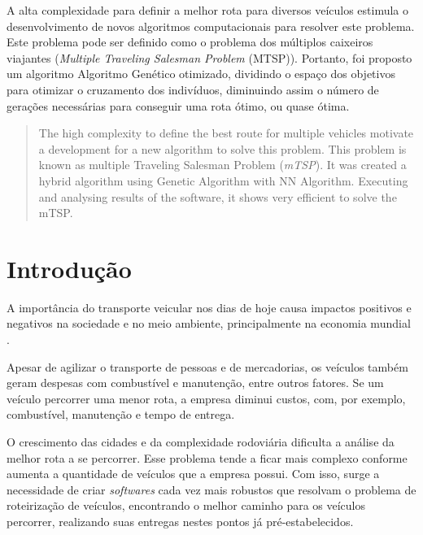 \documentclass{abnt}
\begin{document}
	\listadefiguras
	
	\begin{resumo}
		A alta complexidade para definir a melhor rota para diversos veículos estimula o desenvolvimento de novos algoritmos computacionais para resolver este problema. Este problema pode ser definido como o problema dos múltiplos caixeiros viajantes (\textit{Multiple Traveling Salesman Problem} (MTSP)). Portanto, foi proposto um algoritmo Algoritmo Genético otimizado, dividindo o espaço dos objetivos para otimizar o cruzamento dos indivíduos, diminuindo assim o número de gerações necessárias para conseguir uma rota ótimo, ou quase ótima.

	\end{resumo}

	\begin{abstract}
		The high complexity to define the best route for multiple vehicles motivate a development for a new algorithm to solve this problem. This problem is known as multiple Traveling Salesman Problem (\textit{mTSP}). It was created a hybrid algorithm using Genetic Algorithm with NN Algorithm. Executing and analysing results of the software, it shows very efficient to solve the mTSP.  
	\end{abstract}

	\chapter{Introdução}
		
		A importância do transporte veicular nos dias de hoje causa impactos positivos e negativos 
		na sociedade e no meio ambiente, principalmente na economia mundial \cite{meioAmbiente}. 
		
		Apesar de agilizar o transporte de pessoas e  de mercadorias, 
		os veículos também geram despesas com combustível e manutenção, entre outros fatores. 
		Se um veículo percorrer uma menor rota, a empresa diminui custos, com, por exemplo, 
		combustível, manutenção e tempo de entrega.

		O crescimento das cidades e da complexidade rodoviária dificulta a análise da melhor rota a se percorrer. Esse problema tende a ficar mais complexo conforme aumenta a quantidade de veículos que a empresa possui. Com isso, surge a necessidade de criar 
		\textit{softwares} cada vez mais robustos que resolvam o problema de roteirização de veículos, encontrando o melhor caminho para os veículos percorrer, realizando suas entregas nestes pontos já pré-estabelecidos.
\end{document}
